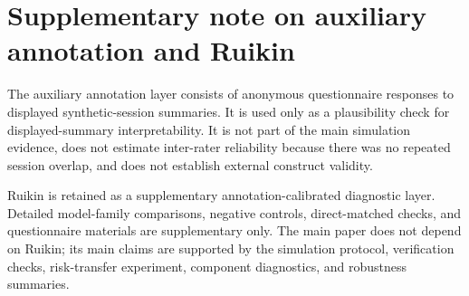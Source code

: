 \section*{Supplementary note on auxiliary annotation and Ruikin}

The auxiliary annotation layer consists of anonymous questionnaire responses to displayed synthetic-session summaries. It is used only as a plausibility check for displayed-summary interpretability. It is not part of the main simulation evidence, does not estimate inter-rater reliability because there was no repeated session overlap, and does not establish external construct validity.

Ruikin is retained as a supplementary annotation-calibrated diagnostic layer. Detailed model-family comparisons, negative controls, direct-matched checks, and questionnaire materials are supplementary only. The main paper does not depend on Ruikin; its main claims are supported by the simulation protocol, verification checks, risk-transfer experiment, component diagnostics, and robustness summaries.

